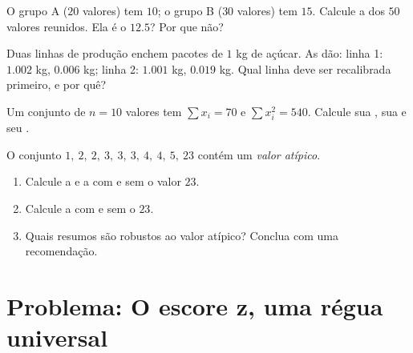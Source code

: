 \begin{exercise}[$\star\star$]\label{exo:g11:stat:7}
O grupo A ($20$ valores) tem  $10$; o grupo B ($30$ valores) tem
 $15$. Calcule a  dos $50$ valores reunidos. Ela é o  $12.5$? Por que não?
\end{exercise}

\begin{exercise}[$\star\star$]\label{exo:g11:stat:8}
Duas linhas de produção enchem pacotes de $1$ kg de açúcar. As 
dão: linha 1:  $1.002$ kg,  $0.006$ kg; linha 2: 
$1.001$ kg,  $0.019$ kg. Qual linha deve ser recalibrada
primeiro, e por quê?
\end{exercise}

\begin{exercise}[$\star\star$]\label{exo:g11:stat:9}
Um conjunto de $n = 10$ valores tem $\sum x_i = 70$ e
$\sum x_i^2 = 540$. Calcule sua , sua  e seu .
\end{exercise}

\begin{exercise}[$\star\star\star$]\label{exo:g11:stat:10}
O conjunto $1,\ 2,\ 2,\ 3,\ 3,\ 3,\ 4,\ 4,\ 5,\ 23$ contém um
\emph{valor atípico}.
\begin{enumerate}
  \item Calcule a  e a  com e sem o valor $23$.
  \item Calcule a  com e sem o $23$.
  \item Quais resumos são robustos ao valor atípico? Conclua com uma
        recomendação.
\end{enumerate}
\end{exercise}

\section{Problema: O escore z, uma régua universal}

